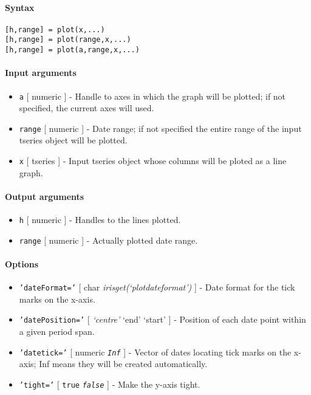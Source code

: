 


	\paragraph{Syntax}\label{syntax}

\begin{verbatim}
[h,range] = plot(x,...)
[h,range] = plot(range,x,...)
[h,range] = plot(a,range,x,...)
\end{verbatim}

\paragraph{Input arguments}\label{input-arguments}

\begin{itemize}
\item
  \texttt{a} {[} numeric {]} - Handle to axes in which the graph will be
  plotted; if not specified, the current axes will used.
\item
  \texttt{range} {[} numeric {]} - Date range; if not specified the
  entire range of the input tseries object will be plotted.
\item
  \texttt{x} {[} tseries {]} - Input tseries object whose columns will
  be ploted as a line graph.
\end{itemize}

\paragraph{Output arguments}\label{output-arguments}

\begin{itemize}
\item
  \texttt{h} {[} numeric {]} - Handles to the lines plotted.
\item
  \texttt{range} {[} numeric {]} - Actually plotted date range.
\end{itemize}

\paragraph{Options}\label{options}

\begin{itemize}
\item
  \texttt{'dateFormat='} {[} char \textbar{}
  \emph{irisget(`plotdateformat')} {]} - Date format for the tick marks
  on the x-axis.
\item
  \texttt{'datePosition='} {[} \emph{`centre'} \textbar{} `end'
  \textbar{} `start' {]} - Position of each date point within a given
  period span.
\item
  \texttt{'datetick='} {[} numeric \textbar{} \emph{\texttt{Inf}} {]} -
  Vector of dates locating tick marks on the x-axis; Inf means they will
  be created automatically.
\item
  \texttt{'tight='} {[} \texttt{true} \textbar{} \emph{\texttt{false}}
  {]} - Make the y-axis tight.
\end{itemize}

